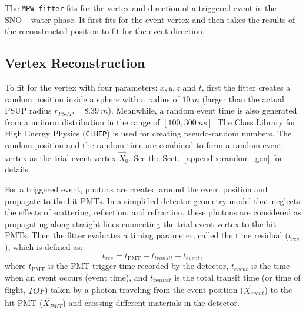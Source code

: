 The \texttt{MPW fitter} fits for the vertex and direction of a triggered event in the SNO+ water phase. It first fits for the event vertex and then takes the results of the reconstructed position to fit for the event direction.

\subsection{Vertex Reconstruction}\label{sect:waterVertex}

To fit for the vertex with four parameters: $x,y,z$ and $t$, first the fitter creates a random position inside a sphere with a radius of $10~m$ (larger than the actual PSUP radius $r_{PSUP}=8.39~m$). Meanwhile, a random event time is also generated from a uniform distribution in the range of $[100,300~ns]$. The Class Library for High Energy Physics (\texttt{CLHEP}) is used for creating pseudo-random numbers. The random position and the random time are combined to form a random event vertex as the trial event vertex $\vec{X}_0$. See the Sect.~\ref{appendix:random_gen} for details.

For a triggered event, photons are created around the event position and propagate to the hit PMTs. In a simplified detector geometry model that neglects the effects of scattering, reflection, and refraction, these photons are considered as propagating along straight lines connecting the trial event vertex to the hit PMTs. Then the fitter evaluates a timing parameter, called the time residual ($t_{res}$), which is defined as:
\begin{equation}
\label{eq:tres_define}
t_{res}=t_\mathrm{PMT} - t_{transit} - t_{event},
\end{equation}
where $t_\mathrm{PMT}$ is the PMT trigger time recorded by the detector, $t_{event}$ is the time when an event occurs (event time), and $t_{transit}$ is the total transit time (or time of flight, $TOF$) taken by a photon traveling from the event position ($\vec{X}_{event}$) to the hit PMT ($\vec{X}_{PMT}$) and crossing different materials in the detector.

